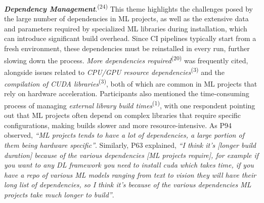 \textit{\textbf{Dependency Management}}.\textsuperscript{(24)} This theme highlights the challenges posed by the large number of dependencies in ML projects, as well as the extensive data and parameters required by specialized ML libraries during installation, which can introduce significant build overhead. Since CI pipelines typically start from a fresh environment, these dependencies must be reinstalled in every run, further slowing down the process.
\textit{More dependencies required}\textsuperscript{(20)} was frequently cited, alongside issues related to \textit{CPU/GPU resource dependencies}\textsuperscript{(3)} and the \textit{compilation of CUDA libraries}\textsuperscript{(3)}, both of which are common in ML projects that rely on hardware acceleration. Participants also mentioned the time-consuming process of managing \textit{external library build times}\textsuperscript{(1)}, with one respondent pointing out that ML projects often depend on complex libraries that require specific configurations, making builds slower and more resource-intensive. As P94 observed, \textit{``ML projects tends to have a lot of dependencies, a large portion of them being hardware specific''}. Similarly, P63 explained, \textit{``I think it's [longer build duration] because of the various dependencies [ML projects require], for example if you want to any DL framework you need to install cuda which takes time, if you have a repo of various ML models ranging from text to vision they will have their long list of dependencies, so I think it's because of the various dependencies ML projects take much longer to build''}.

